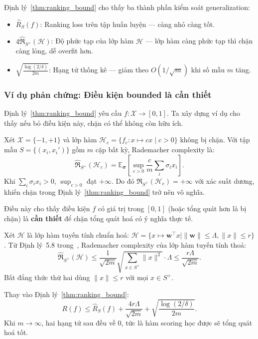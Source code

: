 Định lý~\ref{thm:ranking_bound} cho thấy ba thành phần kiểm soát 
generalization:

\begin{itemize}
  \item $\hat{R}_S(f)$: Ranking loss trên tập huấn luyện — càng 
  nhỏ càng tốt.
  
  \item $4\hat{\mathfrak{R}}_{S^+}(\mathcal{H})$: Độ phức tạp của 
  lớp hàm $\mathcal{H}$ — lớp hàm càng phức tạp thì chặn càng lỏng, 
  dễ overfit hơn.
  
  \item $\sqrt{\frac{\log(2/\delta)}{2m}}$: Hạng tử thống kê — 
  giảm theo $O(1/\sqrt{m})$ khi số mẫu $m$ tăng.
\end{itemize}

\begin{morong}
\subsubsection*{Ví dụ phản chứng: Điều kiện bounded là cần thiết}

Định lý~\ref{thm:ranking_bound} yêu cầu $f: \mathcal{X} \to [0,1]$. 
Ta xây dựng ví dụ cho thấy nếu bỏ điều kiện này, chặn có thể 
không còn hữu ích.

Xét $\mathcal{X} = \{-1, +1\}$ và lớp hàm 
$\mathcal{H}_c = \{f_c : x \mapsto cx \mid c > 0\}$ 
không bị chặn. Với tập mẫu $S = \{(x_i, x_i')\}$ gồm $m$ 
cặp bất kỳ, Rademacher complexity là:
\[
  \hat{\mathfrak{R}}_{S^+}(\mathcal{H}_c) 
  = \mathbb{E}_{\boldsymbol{\sigma}}\left[
      \sup_{c > 0} \frac{c}{m} \sum_{i} \sigma_i x_i
    \right].
\]
Khi $\sum_i \sigma_i x_i > 0$, $\sup_{c>0}$ đạt $+\infty$. 
Do đó $\hat{\mathfrak{R}}_{S^+}(\mathcal{H}_c) = +\infty$ 
với xác suất dương, khiến chặn trong 
Định lý~\ref{thm:ranking_bound} trở nên vô nghĩa.

Điều này cho thấy điều kiện $f$ có giá trị trong $[0,1]$ 
(hoặc tổng quát hơn là bị chặn) là \textbf{cần thiết} để 
chặn tổng quát hoá có ý nghĩa thực tế.
\end{morong}

\begin{example}
Xét $\mathcal{H}$ là lớp hàm tuyến tính chuẩn hoá: 
$\mathcal{H} = \{x \mapsto \mathbf{w}^\top x \mid \|\mathbf{w}\| \leq \Lambda, 
\|x\| \leq r\}$. Từ Định lý~5.8 trong~\cite{mohri2018foundations}, 
Rademacher complexity của lớp hàm tuyến tính thoả:
\[
  \hat{\mathfrak{R}}_{S^+}(\mathcal{H}) 
  \leq \frac{1}{\sqrt{2m}}
       \sqrt{\sum_{x \in S^+} \|x\|^2} \cdot \Lambda
  \leq \frac{r\Lambda}{\sqrt{2m}}.
\]
Bất đẳng thức thứ hai dùng $\|x\| \leq r$ với mọi $x \in S^+$.

Thay vào Định lý~\ref{thm:ranking_bound}:
\[
  R(f) \leq \hat{R}_S(f) + \frac{4r\Lambda}{\sqrt{2m}} 
  + \sqrt{\frac{\log(2/\delta)}{2m}}.
\]
Khi $m \to \infty$, hai hạng tử sau đều về $0$, tức là hàm 
scoring học được sẽ tổng quát hoá tốt.
\end{example}

